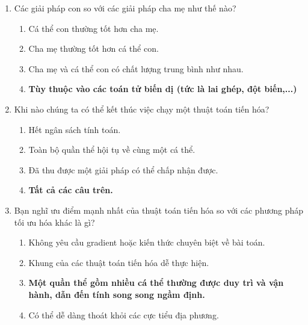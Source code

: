 \documentclass{book}
\begin{document}
\begin{enumerate}
\begin{multicols}{2}
        \begin{enumerate}[label=\Alph*]
            \item Lai ghép (Crossover)
            \item Đột biến (Mutation)
            \item \textbf{Lựa chọn (Selection)}
            \item Cập nhật giá trị tham số của các cá thể
        \end{enumerate}
    \end{multicols}
    \item Các giải pháp con so với các giải pháp cha mẹ như thế nào?
    \begin{multicols}{2}
        \begin{enumerate}[label=\Alph*]
            \item Cá thể con thường tốt hơn cha mẹ.
            \item Cha mẹ thường tốt hơn cá thể con.
            \item Cha mẹ và cá thể con có chất lượng trung bình như nhau.
            \item \textbf{Tùy thuộc vào các toán tử biến dị (tức là lai ghép, đột biến,...)}
        \end{enumerate}
    \end{multicols}
    \item Khi nào chúng ta có thể kết thúc việc chạy một thuật toán tiến hóa?
    \begin{multicols}{2}
        \begin{enumerate}[label=\Alph*]
            \item Hết ngân sách tính toán.
            \item Toàn bộ quần thể hội tụ về cùng một cá thể.
            \item Đã thu được một giải pháp có thể chấp nhận được.
            \item \textbf{Tất cả các câu trên.}
        \end{enumerate}
    \end{multicols}
    \item Bạn nghĩ ưu điểm mạnh nhất của thuật toán tiến hóa so với các phương pháp tối ưu hóa khác là gì?
    \begin{multicols}{2}
        \begin{enumerate}[label=\Alph*]
            \item Không yêu cầu gradient hoặc kiến thức chuyên biệt về bài toán.
            \item Khung của các thuật toán tiến hóa dễ thực hiện.
            \item \textbf{Một quần thể gồm nhiều cá thể thường được duy trì và vận hành, dẫn đến tính song song ngầm định.}
            \item Có thể dễ dàng thoát khỏi các cực tiểu địa phương.
        \end{enumerate}
    \end{multicols}
\end{enumerate}
\end{document}
